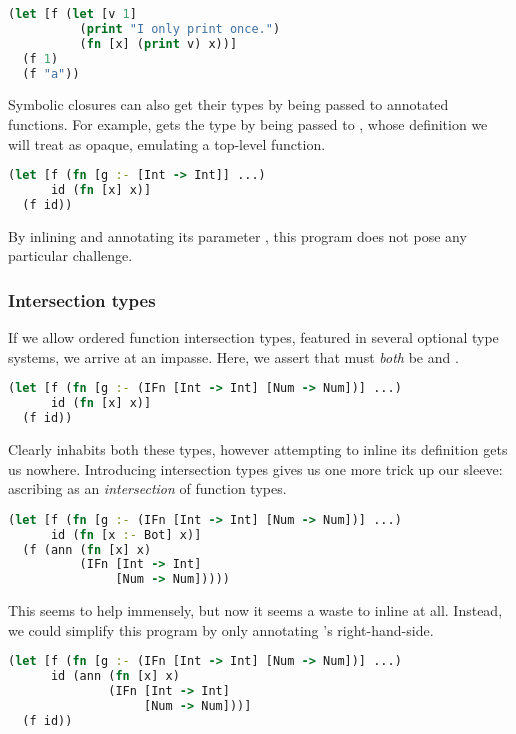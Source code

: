 \begin{lstlisting}[language=Clojure]
(let [f (let [v 1]
          (print "I only print once.")
          (fn [x] (print v) x))]
  (f 1)
  (f "a"))
\end{lstlisting}

Symbolic closures can also get their types by being passed
to annotated functions.
For example, 
gets the type 
by being passed to , whose definition we will treat
as opaque, emulating a top-level function.

\begin{lstlisting}[language=Clojure]
(let [f (fn [g :- [Int -> Int]] ...)
      id (fn [x] x)]
  (f id))
\end{lstlisting}

By inlining  and annotating its parameter ,
this program does not pose any particular challenge.

\subsubsection{Intersection types}

If we allow ordered function intersection types,
featured in several optional type systems,
we arrive at an impasse.
Here, we assert that  must \emph{both}
be
and
.

\begin{lstlisting}[language=Clojure]
(let [f (fn [g :- (IFn [Int -> Int] [Num -> Num])] ...)
      id (fn [x] x)]
  (f id))
\end{lstlisting}

Clearly  inhabits both these types,
however attempting to inline its definition
gets us nowhere.
Introducing intersection types gives us
one more trick up our sleeve: ascribing
 as an \emph{intersection} of function types.

\begin{lstlisting}[language=Clojure]
(let [f (fn [g :- (IFn [Int -> Int] [Num -> Num])] ...)
      id (fn [x :- Bot] x)]
  (f (ann (fn [x] x)
          (IFn [Int -> Int]
               [Num -> Num]))))
\end{lstlisting}

This seems to help immensely, but now it seems a waste
to inline  at all.
Instead, we could simplify this program by only annotating 's
right-hand-side.

\begin{lstlisting}[language=Clojure]
(let [f (fn [g :- (IFn [Int -> Int] [Num -> Num])] ...)
      id (ann (fn [x] x)
              (IFn [Int -> Int]
                   [Num -> Num]))]
  (f id))
\end{lstlisting}

